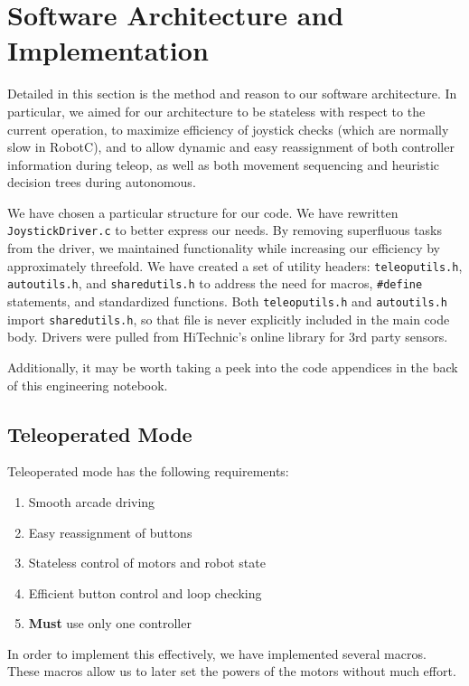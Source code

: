\section{Software Architecture and Implementation}
Detailed in this section is the method and reason to our software architecture. In particular, we aimed for our architecture to be stateless with respect to the current operation, to maximize efficiency of joystick checks (which are normally slow in RobotC), and to allow dynamic and easy reassignment of both controller information during teleop, as well as both movement sequencing and heuristic decision trees during autonomous.

We have chosen a particular structure for our code. We have rewritten \lstinline{JoystickDriver.c}{} to better express our needs. By removing superfluous tasks from the driver, we maintained functionality while increasing our efficiency by approximately threefold. We have created a set of utility headers: \lstinline{teleoputils.h}{}, \lstinline{autoutils.h}{}, and \lstinline{sharedutils.h}{} to address the need for macros, \lstinline{#define}{} statements, and standardized functions. Both \lstinline{teleoputils.h}{} and \lstinline{autoutils.h}{} import \lstinline{sharedutils.h}{}, so that file is never explicitly included in the main code body. Drivers were pulled from HiTechnic's online library for 3rd party sensors.

Additionally, it may be worth taking a peek into the code appendices in the back of this engineering notebook.

\subsection{Teleoperated Mode}

Teleoperated mode has the following requirements: \begin{enumerate}
	\item{Smooth arcade driving}
	\item{Easy reassignment of buttons}
	\item{Stateless control of motors and robot state}
	\item{Efficient button control and loop checking}
	\item{\textbf{Must} use only one controller}
\end{enumerate}

In order to implement this effectively, we have implemented several macros. These macros allow us to later set the powers of the motors without much effort. 

